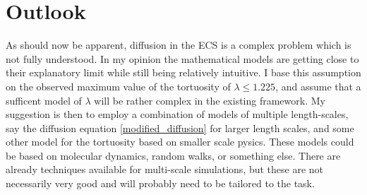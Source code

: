 \documentclass[a4paper,english, 12pt, twoside]{article}
\begin{document}
\section{Outlook}
As should now be apparent, diffusion in the ECS is a complex problem which is not fully understood. 
In my opinion the mathematical models are getting close to their explanatory limit while still being relatively intuitive. 
I base this assumption on the observed maximum value of the tortuosity of $\lambda\leq 1.225$, and assume that a sufficent model of $\lambda$ will be rather complex in the existing framework. 
My suggestion is then to employ a combination of models of multiple length-scales, say the diffusion equation \ref{modified_diffusion} for larger length scales, and some other model for the tortuosity based on smaller scale pysics. 
These models could be based on molecular dynamics, random walks, or something else. 
There are already techniques available for multi-scale simulations, but these are not necessarily very good and will probably need to be tailored to the task.
%   

\printbibliography
\end{document}
